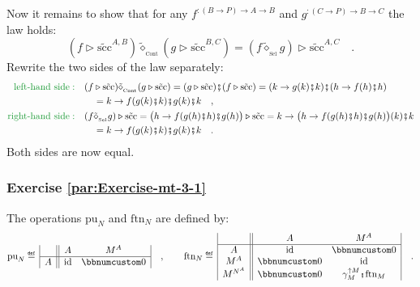Now it remains to show that for any $f^{:\left(B\rightarrow P\right)\rightarrow A\rightarrow B}$
and $g^{:\left(C\rightarrow P\right)\rightarrow B\rightarrow C}$
the law holds:
\[
(f\triangleright\tilde{\text{scc}}^{A,B})\tilde{\diamond}_{_{\text{Cont}}}(g\triangleright\tilde{\text{scc}}^{B,C})=(f\tilde{\diamond}_{_{\text{Sel}}}g)\triangleright\tilde{\text{scc}}^{A,C}\quad.
\]
Rewrite the two sides of the law separately:
\begin{align*}
{\color{greenunder}\text{left-hand side}:}\quad & (f\triangleright\tilde{\text{scc}})\tilde{\diamond}_{_{\text{Cont}}}(g\triangleright\tilde{\text{scc}})=(g\triangleright\tilde{\text{scc}})\bef(f\triangleright\tilde{\text{scc}})=(k\rightarrow g(k)\bef k)\bef(h\rightarrow f(h)\bef h)\\
 & \quad=k\rightarrow f(g(k)\bef k)\bef g(k)\bef k\quad,\\
{\color{greenunder}\text{right-hand side}:}\quad & (f\tilde{\diamond}_{_{\text{Sel}}}g)\triangleright\tilde{\text{scc}}=\big(h\rightarrow f(g(h)\bef h)\bef g(h)\big)\triangleright\tilde{\text{scc}}=k\rightarrow\big(h\rightarrow f(g(h)\bef h)\bef g(h)\big)(k)\bef k\\
 & \quad=k\rightarrow f(g(k)\bef k)\bef g(k)\bef k\quad.
\end{align*}
Both sides are now equal.

\subsubsection*{Exercise \ref{par:Exercise-mt-3-1}}

The operations $\text{pu}_{N}$ and $\text{ftn}_{N}$ are defined
by:
\[
\text{pu}_{N}\triangleq\,\begin{array}{|c||cc|}
 & A & M^{A}\\
\hline A & \text{id} & \bbnum 0
\end{array}\quad,\quad\quad\text{ftn}_{N}\triangleq\,\begin{array}{|c||cc|}
 & A & M^{A}\\
\hline A & \text{id} & \bbnum 0\\
M^{A} & \bbnum 0 & \text{id}\\
M^{N^{A}} & \bbnum 0 & \gamma_{M}^{\uparrow M}\bef\text{ftn}_{M}
\end{array}\quad.
\]


